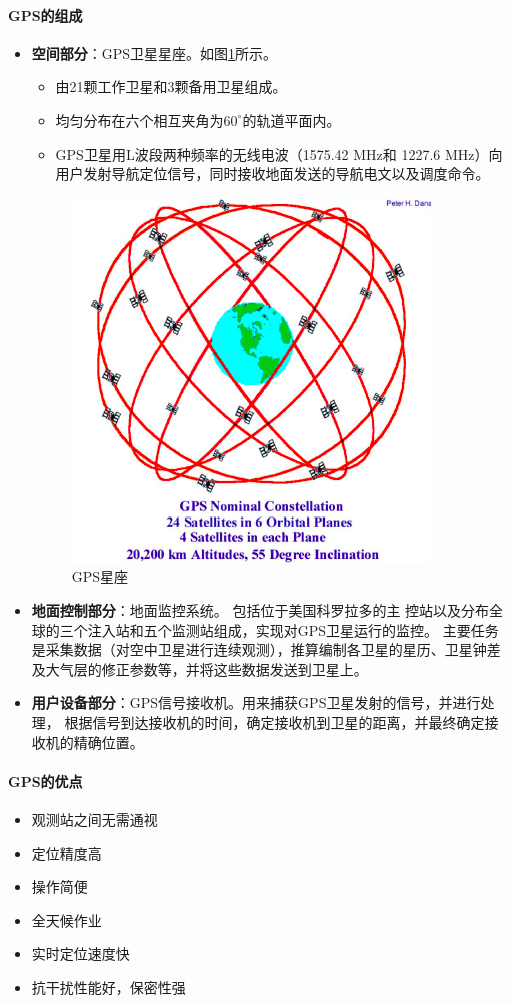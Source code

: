 \paragraph{GPS的组成}
\begin{itemize}
	\item \textbf{空间部分}：GPS卫星星座。如图\ref{fig:GPS星座}所示。
		\begin{itemize}
			\item 由21颗工作卫星和3颗备用卫星组成。
			\item 均匀分布在六个相互夹角为$ 60^{\circ} $的轨道平面内。
			\item GPS卫星用L波段两种频率的无线电波（1575.42 MHz和 1227.6 MHz）向用户发射导航定位信号，同时接收地面发送的导航电文以及调度命令。
		\end{itemize}
		
		\begin{figure}[htbp]
			\centering
			\includegraphics[width=0.5\linewidth]{figure/Chapter3/GPS星座}
			\caption{GPS星座}
			\label{fig:GPS星座}
		\end{figure}
	\item \textbf{地面控制部分}：地面监控系统。
		包括位于美国科罗拉多的主 控站以及分布全球的三个注入站和五个监测站组成，实现对GPS卫星运行的监控。
		主要任务是采集数据（对空中卫星进行连续观测），推算编制各卫星的星历、卫星钟差及大气层的修正参数等，并将这些数据发送到卫星上。
	\item \textbf{用户设备部分}：GPS信号接收机。用来捕获GPS卫星发射的信号，并进行处理，
		根据信号到达接收机的时间，确定接收机到卫星的距离，并最终确定接收机的精确位置。
\end{itemize} %

\paragraph{GPS的优点}
\begin{itemize}
	\item 观测站之间无需通视
	\item 定位精度高
	\item 操作简便
	\item 全天候作业
	\item 实时定位速度快
	\item 抗干扰性能好，保密性强
\end{itemize}


